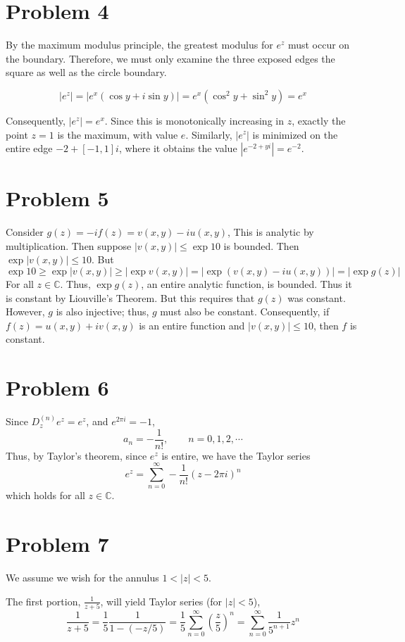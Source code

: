 \documentclass{article}
\theoremstyle{definition}
\newcommand{\Co}{\mathbb{C}}
\newcommand{\p}[1]{\left(#1\right)}
\newcommand{\abs}[1]{\left|#1\right|}
\begin{document}
\section{Problem 4}
By the maximum modulus principle, the greatest modulus for $e^z$ must
occur on the boundary. Therefore, we must only examine the three exposed edges 
the square as well as the circle boundary.

\[ 
\abs{e^z} 
= \abs{e^x(\cos y + i \sin y)}
= e^x (\cos^2 y + \sin^2 y)
= e^x
\]

Consequently, $\abs{e^z}=e^x$. Since this is monotonically increasing in $z$, 
exactly the point $z=1$ is the maximum, with value
$e$. Similarly, $\abs{e^z}$ is minimized on the entire edge $-2+[-1,1]i$,
where it obtains the value $\abs{e^{-2+yi}}=e^{-2}$.

\section{Problem 5}
Consider $g(z)=-if(z)=v(x,y) - iu(x,y)$, This is analytic by multiplication. Then 
suppose $\abs{v(x,y)} \le \exp 10$ is bounded. Then $\exp \abs{v(x,y)} \le 10$.
But 
\[ 
\exp 10 
\ge \exp\abs{v(x,y)}
\ge \abs{\exp v(x,y)}
= \abs{\exp\p{v(x,y) - i u(x,y)}}
= \abs{\exp g(z)}
\]
For all $z \in \Co$. Thus, $\exp g(z)$, an entire analytic function, is bounded.
Thus it is constant by Liouville's Theorem. But this requires that $g(z)$ was
constant. However, $g$ is also injective; thus, 
$g$ must also be constant. Consequently, if $f(z) = u(x,y)+iv(x,y)$ is an entire
function and $\abs{v(x,y)} \le 10$, then $f$ is constant.

\section{Problem 6}
Since $D_z^{(n)} e^z = e^z$, and $e^{2 \pi i}=-1$, 
\[ a_n=-\frac{1}{n!}, \qquad n=0,1,2,\cdots \]
Thus, by Taylor's theorem, since $e^z$ is entire, we have the Taylor series
\[
e^z = \sum_{n=0}^\infty -\frac{1}{n!} (z-2 \pi i)^n
\]
which holds for all $z \in \Co$.

\section{Problem 7}
We assume we wish for the annulus $1 < \abs{z} < 5$.

The first portion, $\frac{1}{z+5}$, will yield Taylor series
(for $\abs{z}<5$),
\[ 
\frac{1}{z+5} 
= \frac{1}{5} \frac{1}{1 -(- z/5)}
= \frac{1}{5} \sum_{n=0}^\infty \p{\frac{z}{5}}^n
= \sum_{n=0}^\infty \frac{1}{5^{n+1}} z^n
\]
\end{document}
